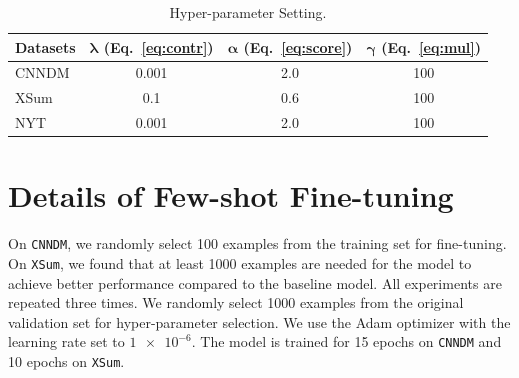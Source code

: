 \documentclass[11pt]{article}
\begin{document}
\begin{table}[t]
\centering
\begin{tabular}{lccc}
\toprule
\textbf{Datasets} &  $\mathbf{\lambda}$ (Eq.~\ref{eq:contr}) & $\mathbf{\alpha}$ (Eq.~\ref{eq:score})   &  $\mathbf{\gamma}$ (Eq.~\ref{eq:mul}) \\
\midrule
 CNNDM & 0.001 & 2.0 & 100 \\
 XSum & 0.1 & 0.6 & 100 \\
 NYT & 0.001 & 2.0 & 100  \\
\bottomrule
\end{tabular}
\caption{\label{tab:appendix} Hyper-parameter Setting.}
\end{table}

\section{Details of Few-shot Fine-tuning}
\label{appendix:few-shot}

On \texttt{CNNDM}, we randomly select 100 examples from the training set for fine-tuning.
On \texttt{XSum}, we found that at least 1000 examples are needed for the model to achieve better performance compared to the baseline model.
All experiments are repeated three times.
We randomly select 1000 examples from the original validation set for hyper-parameter selection.
We use the Adam optimizer with the learning rate set to $\num{1e-6}$.
The model is trained for 15 epochs on \texttt{CNNDM} and 10 epochs on \texttt{XSum}.

\end{document}
